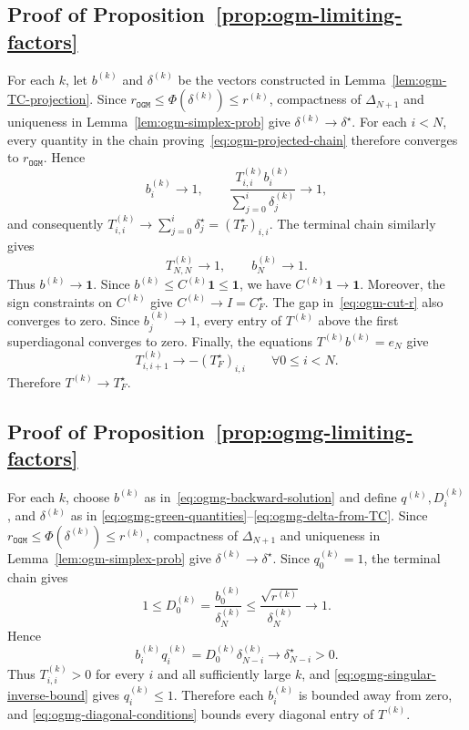 \documentclass[11pt]{article}
\begin{document}
\subsection{Proof of Proposition~\ref{prop:ogm-limiting-factors}}
For each $k$, let $b^{(k)}$ and $\delta^{(k)}$ be the vectors constructed in
Lemma~\ref{lem:ogm-TC-projection}. Since $r_\mathtt{OGM}
    \leq\Phi(\delta^{(k)})
    \leq r^{(k)}$,
compactness of $\Delta_{N+1}$ and uniqueness in
Lemma~\ref{lem:ogm-simplex-prob} give
$\delta^{(k)}\to\delta^\star$. For each $i<N$, every quantity in the
chain proving~\eqref{eq:ogm-projected-chain} therefore converges to
$r_\mathtt{OGM}$. Hence
\[
    b_i^{(k)}\to1,
    \qquad
    \frac{T_{i,i}^{(k)}b_i^{(k)}}
    {\sum_{j=0}^i\delta_j^{(k)}}\to1,
\]
and consequently $T_{i,i}^{(k)}
    \to\sum_{j=0}^i\delta_j^\star
    =(T_F^\star)_{i,i}$.
The terminal chain similarly gives
\[
    T_{N,N}^{(k)}\to1,
    \qquad
    b_N^{(k)}\to1.
\]
Thus $b^{(k)}\to\mathbf1$. Since $b^{(k)}\leq C^{(k)}\mathbf1\leq\mathbf1$,
we have $C^{(k)}\mathbf1\to\mathbf1$. Moreover, the sign constraints on
$C^{(k)}$ give $C^{(k)}\to I=C_F^\star$.
The gap in~\eqref{eq:ogm-cut-r} also converges to zero. Since
$b_j^{(k)}\to1$, every entry of $T^{(k)}$ above the first superdiagonal
converges to zero. Finally, the equations
$T^{(k)}b^{(k)}=e_N$ give
\[
    T_{i,i+1}^{(k)}\to-(T_F^\star)_{i,i}
    \qquad \forall 0\leq i<N.
\]
Therefore $T^{(k)}\to T_F^\star$.

\subsection{Proof of Proposition~\ref{prop:ogmg-limiting-factors}}
For each $k$, choose $b^{(k)}$ as in~\eqref{eq:ogmg-backward-solution} and
define $q^{(k)},D_i^{(k)}$, and $\delta^{(k)}$ as in
\eqref{eq:ogmg-green-quantities}--\eqref{eq:ogmg-delta-from-TC}. Since $r_\mathtt{OGM}
    \leq \Phi(\delta^{(k)})
    \leq r^{(k)}$,
compactness of $\Delta_{N+1}$ and uniqueness in
Lemma~\ref{lem:ogm-simplex-prob} give
$\delta^{(k)}\to\delta^\star$. Since $q_0^{(k)}=1$, the terminal chain gives
\[
    1\leq D_0^{(k)}
    =\frac{b_0^{(k)}}{\delta_N^{(k)}}
    \leq\frac{\sqrt{r^{(k)}}}{\delta_N^{(k)}}
    \longrightarrow1.
\]
Hence
\[
    b_i^{(k)}q_i^{(k)}
    =D_0^{(k)}\delta_{N-i}^{(k)}
    \longrightarrow\delta_{N-i}^\star>0.
\]
Thus $T_{i,i}^{(k)}>0$ for every $i$ and all sufficiently large $k$, and
\eqref{eq:ogmg-singular-inverse-bound} gives $q_i^{(k)}\leq1$. Therefore
each $b_i^{(k)}$ is bounded away from zero, and
\eqref{eq:ogmg-diagonal-conditions} bounds every diagonal entry of
$T^{(k)}$.
\end{document}
